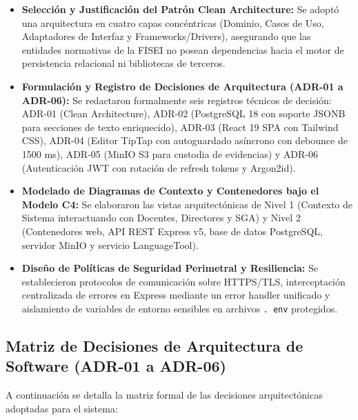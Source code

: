 \documentclass[12pt,a4paper]{article}
\begin{document}
\begin{itemize}[leftmargin=1.5em, itemsep=4pt]
    \item \textbf{Selección y Justificación del Patrón Clean Architecture:} Se adoptó una arquitectura en cuatro capas concéntricas (Dominio, Casos de Uso, Adaptadores de Interfaz y Frameworks/Drivers), asegurando que las entidades normativas de la FISEI no posean dependencias hacia el motor de persistencia relacional ni bibliotecas de terceros.
    \item \textbf{Formulación y Registro de Decisiones de Arquitectura (ADR-01 a ADR-06):} Se redactaron formalmente seis registros técnicos de decisión: ADR-01 (Clean Architecture), ADR-02 (PostgreSQL 18 con soporte JSONB para secciones de texto enriquecido), ADR-03 (React 19 SPA con Tailwind CSS), ADR-04 (Editor TipTap con autoguardado asíncrono con debounce de 1500 ms), ADR-05 (MinIO S3 para custodia de evidencias) y ADR-06 (Autenticación JWT con rotación de refresh tokens y Argon2id).
    \item \textbf{Modelado de Diagramas de Contexto y Contenedores bajo el Modelo C4:} Se elaboraron las vistas arquitectónicas de Nivel 1 (Contexto de Sistema interactuando con Docentes, Directores y SGA) y Nivel 2 (Contenedores web, API REST Express v5, base de datos PostgreSQL, servidor MinIO y servicio LanguageTool).
    \item \textbf{Diseño de Políticas de Seguridad Perimetral y Resiliencia:} Se establecieron protocolos de comunicación sobre HTTPS/TLS, interceptación centralizada de errores en Express mediante un error handler unificado y aislamiento de variables de entorno sensibles en archivos \texttt{. env} protegidos.
\end{itemize}

\subsection{Matriz de Decisiones de Arquitectura de Software (ADR-01 a ADR-06)}
A continuación se detalla la matriz formal de las decisiones arquitectónicas adoptadas para el sistema:
\end{document}
